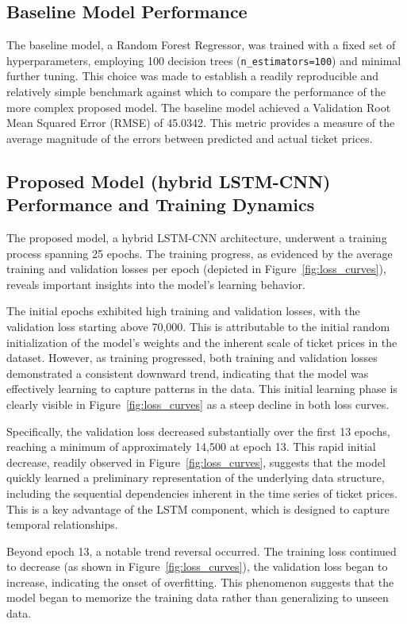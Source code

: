 \documentclass[conference]{IEEEtran}
\begin{document}
\subsection{Baseline Model Performance}\label{7b}
The baseline model, a Random Forest Regressor, was trained with a fixed set of hyperparameters, employing 100 decision trees (\texttt{n\_estimators=100}) and minimal further tuning. This choice was made to establish a readily reproducible and relatively simple benchmark against which to compare the performance of the more complex proposed model. The baseline model achieved a Validation Root Mean Squared Error (RMSE) of 45.0342. This metric provides a measure of the average magnitude of the errors between predicted and actual ticket prices.
    
\subsection{Proposed Model (hybrid LSTM-CNN) Performance and Training Dynamics}\label{7c}
The proposed model, a hybrid LSTM-CNN architecture, underwent a training process spanning 25 epochs. The training progress, as evidenced by the average training and validation losses per epoch (depicted in Figure~\ref{fig:loss_curves}), reveals important insights into the model's learning behavior.

The initial epochs exhibited high training and validation losses, with the validation loss starting above 70,000. This is attributable to the initial random initialization of the model's weights and the inherent scale of ticket prices in the dataset. However, as training progressed, both training and validation losses demonstrated a consistent downward trend, indicating that the model was effectively learning to capture patterns in the data. This initial learning phase is clearly visible in Figure~\ref{fig:loss_curves} as a steep decline in both loss curves.

Specifically, the validation loss decreased substantially over the first 13 epochs, reaching a minimum of approximately 14,500 at epoch 13. This rapid initial decrease, readily observed in Figure~\ref{fig:loss_curves}, suggests that the model quickly learned a preliminary representation of the underlying data structure, including the sequential dependencies inherent in the time series of ticket prices. This is a key advantage of the LSTM component, which is designed to capture temporal relationships.

Beyond epoch 13, a notable trend reversal occurred. The training loss continued to decrease (as shown in Figure~\ref{fig:loss_curves}), the validation loss began to increase, indicating the onset of overfitting. This phenomenon suggests that the model began to memorize the training data rather than generalizing to unseen data.
\end{document}
